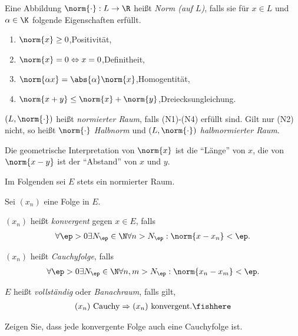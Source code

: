 \begin{defn}
\label{defn:1.3}
Eine Abbildung $\norm{\cdot}: L\to\R$ heißt \emph{Norm (auf $L$)},
falls sie für $x\in L$ und $\alpha\in\K$ folgende Eigenschaften erfüllt.
\begin{enumerate}[label=(N\arabic{*})]
  \item $\norm{x}\ge 0$,\qquad Positivität,
  \item $\norm{x} = 0\Leftrightarrow x=0$,\qquad Definitheit,
  \item $\norm{\alpha x} = \abs{\alpha}\norm{x}$,\qquad Homogentität,
  \item $\norm{x+y} \le \norm{x}+\norm{y}$,\qquad Dreiecksungleichung.
\end{enumerate}
$(L,\norm{\cdot})$ heißt \emph{normierter Raum},
falls (N1)-(N4) erfüllt sind. Gilt nur (N2) nicht, so heißt $\norm{\cdot}$
\emph{Halbnorm} und $(L,\norm{\cdot})$ \emph{halbnormierter Raum}.\fishhere
\end{defn}

Die geometrische Interpretation von $\norm{x}$ ist die ``Länge'' von $x$, die
von $\norm{x-y}$ ist der ``Abstand'' von $x$ und $y$.

Im Folgenden sei $E$ stets ein normierter Raum.

\begin{defn}
\label{defn:1.4}
Sei $(x_n)$ eine Folge in $E$.
\begin{defnenum}
  \item $(x_n)$ heißt \emph{konvergent} gegen $x\in E$, falls
\begin{align*}
\forall \ep > 0 \exists N_\ep \in \N \forall n> N_\ep : \norm{x-x_n} < \ep.
\end{align*}
\item $(x_n)$ heißt \emph{Cauchyfolge}, falls
\begin{align*}
\forall \ep > 0 \exists N_\ep \in\N \forall n,m> N_\ep : \norm{x_n-x_m} < \ep.
\end{align*}
\item $E$ heißt \emph{vollständig} oder
\emph{Banachraum}, falls gilt,
\begin{align*}
(x_n)\text{ Cauchy} \Rightarrow (x_n) \text{ konvergent}.\fishhere
\end{align*}
\end{defnenum}
\end{defn}

\begin{bemn}[Übung.]
Zeigen Sie, dass jede konvergente Folge auch eine Cauchyfolge ist.\maphere
\end{bemn}

